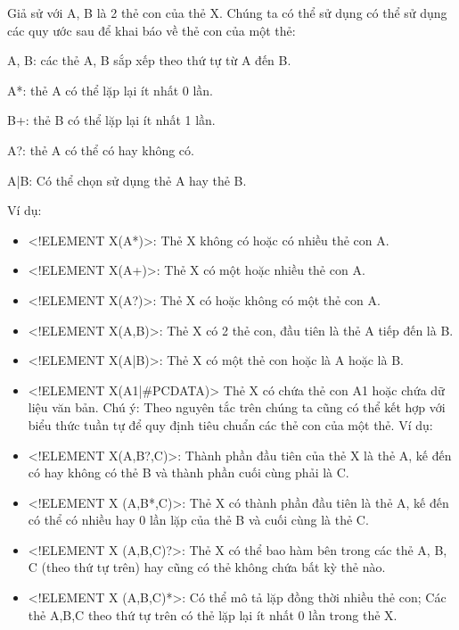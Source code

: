   	Giả sử với {\ttfamily A, B} là 2 thẻ con của thẻ {\ttfamily X}. Chúng ta có thể sử dụng có thể sử dụng các quy ước sau để khai báo về thẻ con của một thẻ:
  	
 {\ttfamily  A, B}: 	các thẻ {\ttfamily A, B} sắp xếp theo thứ tự từ {\ttfamily A} đến {\ttfamily B}.
  
  {\ttfamily A*}:	thẻ {\ttfamily A} có thể lặp lại ít nhất 0 lần.
   
  {\ttfamily B+}:	thẻ {\ttfamily B} có thể lặp lại ít nhất 1 lần.
  
  {\ttfamily A?}:	thẻ {\ttfamily A} có thể có hay không có.
  
  {\ttfamily A|B}:	Có thể chọn sử dụng thẻ {\ttfamily A} hay thẻ {\ttfamily B}.
  
   Ví dụ:
 \begin{itemize}
\item  {\ttfamily <!ELEMENT X(A*)>}: Thẻ {\ttfamily X} không có hoặc có nhiều thẻ con {\ttfamily A}.
\item 	 {\ttfamily <!ELEMENT X(A+)>}: Thẻ {\ttfamily X} có một hoặc nhiều thẻ con {\ttfamily A}.
\item 	 {\ttfamily <!ELEMENT X(A?)>}: Thẻ {\ttfamily X} có hoặc không có một thẻ con {\ttfamily A}.
\item 	 {\ttfamily <!ELEMENT X(A,B)>}: Thẻ {\ttfamily X} có 2 thẻ con, đầu tiên là thẻ {\ttfamily A} tiếp đến là {\ttfamily B}.
\item 	 {\ttfamily <!ELEMENT X(A|B)>}: Thẻ {\ttfamily X} có một thẻ con hoặc là {\ttfamily A} hoặc là {\ttfamily B}.
\item 	 {\ttfamily <!ELEMENT X(A1|\#PCDATA)>} Thẻ {\ttfamily X} có chứa thẻ con {\ttfamily A1} hoặc chứa dữ liệu văn bản.
Chú ý: Theo nguyên tắc trên chúng ta cũng có thể kết hợp với biểu thức tuần tự để quy định tiêu chuẩn các thẻ con của một thẻ. Ví dụ:
\item  {\ttfamily <!ELEMENT X(A,B?,C)>}: Thành phần đầu tiên của thẻ {\ttfamily X} là thẻ {\ttfamily A}, kế đến có hay không có thẻ {\ttfamily B} và thành phần cuối cùng phải là {\ttfamily C}.
\item 	 {\ttfamily <!ELEMENT X (A,B*,C)>}: Thẻ {\ttfamily X} có thành phần đầu tiên là thẻ {\ttfamily A}, kế đến có thể có nhiều hay 0 lần lặp của thẻ {\ttfamily B} và cuối cùng là thẻ {\ttfamily C}.
\item 	 {\ttfamily <!ELEMENT X (A,B,C)?>}: Thẻ {\ttfamily X} có thể bao hàm bên trong các thẻ {\ttfamily A, B, C} (theo thứ tự trên) hay cũng có thẻ không chứa bất kỳ thẻ nào.
\item 	 {\ttfamily <!ELEMENT X (A,B,C)*>}: Có thể mô tả lặp đồng thời nhiều thẻ con; Các thẻ {\ttfamily A,B,C} theo thứ tự trên có thẻ lặp lại ít nhất 0 lần trong thẻ {\ttfamily X}.

\end{itemize}
